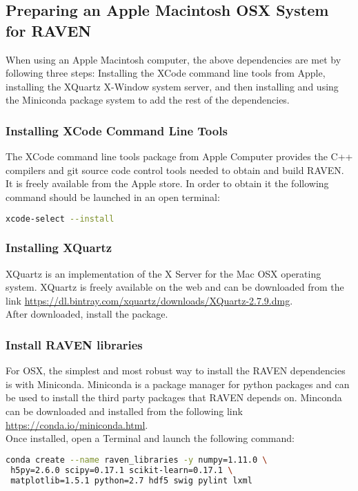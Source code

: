 \goToRavenInstallation

\subsection{Preparing an Apple Macintosh OSX System for RAVEN}
\label{sysprep_osx}

When using an Apple Macintosh computer, the above dependencies are met
by following three steps: Installing the XCode command line tools from Apple,
installing the XQuartz  X-Window system server, and then installing and using the Miniconda
package system to add the rest of the dependencies.

\subsubsection{Installing XCode Command Line Tools}

The XCode command line tools package from Apple Computer provides the C++
compilers and git source code control tools needed to obtain and build RAVEN.
It is freely available from the Apple store. In order to obtain it the following command should be launched in an open terminal:
\begin{lstlisting}[language=bash]
 xcode-select --install
\end{lstlisting}

\subsubsection{Installing XQuartz}
XQuartz is an implementation of the X Server for the Mac OSX operating system.
XQuartz is freely available on the web and can be downloaded from the link 
 \url{https://dl.bintray.com/xquartz/downloads/XQuartz-2.7.9.dmg}.
 \\After downloaded, install the package.


\subsubsection{Install RAVEN libraries}
\label{miniconda}

For OSX, the simplest and most robust way to install the RAVEN
dependencies is with Miniconda.  Miniconda is a package manager for
python packages and can be used to install the third party packages
that RAVEN depends on. Minconda can be downloaded and installed from
the following link \url{https://conda.io/miniconda.html}.
\\Once installed, open a Terminal and launch the following command:
\begin{lstlisting}[language=bash]
conda create --name raven_libraries -y numpy=1.11.0 \
 h5py=2.6.0 scipy=0.17.1 scikit-learn=0.17.1 \
 matplotlib=1.5.1 python=2.7 hdf5 swig pylint lxml
\end{lstlisting}

